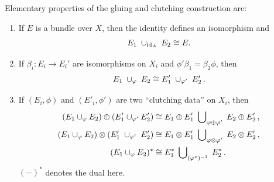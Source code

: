 \begin{corollary}\label{cor:kTheo-elementaryPropertiesGluingAndClutching}
	Elementary properties of the gluing and clutching construction are:
	\begin{enumerate}
		\item If $E$ is a bundle over $X$, then the identity defines an isomorphism and 
		\begin{equation*}
			E_1 \;\cup_{\operatorname{\mathrm{id}}_A} \;E_2 \cong E.
		\end{equation*}
		\item If $\beta_i:E_i \to E_i'$ are isomorphisms on $X_i$ and $\phi' \beta_1=\beta_2\phi$, then  
		\begin{equation*}
			E_1\;\cup_{\varphi} \;E_2 \cong E'_1\;\cup_{\varphi'} \;E'_2 \, .
		\end{equation*}
		\item If $(E_i,\phi)$ and $(E'_i,\phi')$ are two \enquote{clutching data} on $X_i$, then
		\begin{align*}
			(E_1 \cup _{\varphi}E_2)\oplus (E'_1 \cup _{\varphi'}E'_2)&\cong E_1\oplus E'_1 \; \bigcup\nolimits_{\varphi \oplus \varphi'} \;E_2\oplus E'_2 \, ,\\
			(E_1 \cup _{\varphi}E_2)\otimes (E'_1 \;\cup_{\varphi'} \;E'_2)&\cong E_1\otimes E'_1 \; \bigcup\nolimits_{\varphi \otimes \varphi'} \;E_2\otimes E'_2 \, ,\\
			(E_1 \cup _{\varphi}E_2)^* &\cong E^*_1\; \bigcup\nolimits_{(\varphi^*)^{-1}} \;E^*_2 \, .
		\end{align*} $(-)^*$ denotes the dual here.
	\end{enumerate}
\end{corollary}

